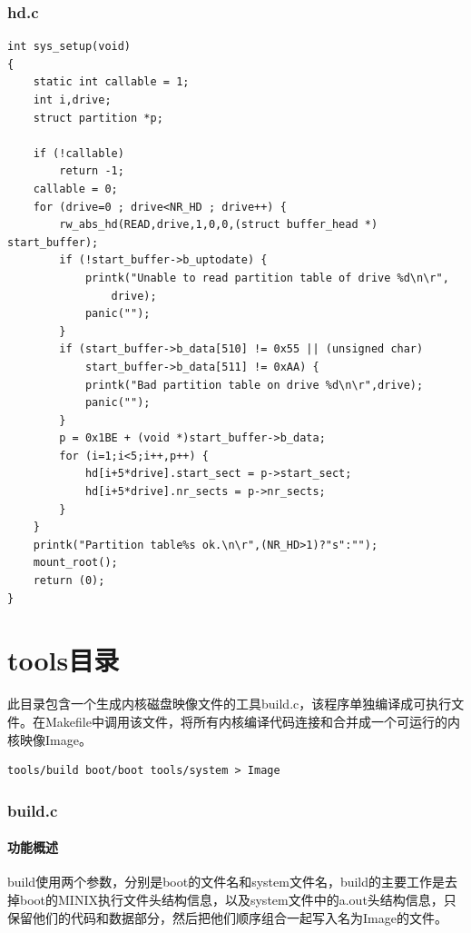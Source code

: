 \documentclass[12pt]{article}
\begin{document}
\section{hd.c}
\begin{lstlisting}[breaklines]
int sys_setup(void)
{
	static int callable = 1;
	int i,drive;
	struct partition *p;

	if (!callable)
		return -1;
	callable = 0;
	for (drive=0 ; drive<NR_HD ; drive++) {
		rw_abs_hd(READ,drive,1,0,0,(struct buffer_head *) start_buffer);
		if (!start_buffer->b_uptodate) {
			printk("Unable to read partition table of drive %d\n\r",
				drive);
			panic("");
		}
		if (start_buffer->b_data[510] != 0x55 || (unsigned char)
		    start_buffer->b_data[511] != 0xAA) {
			printk("Bad partition table on drive %d\n\r",drive);
			panic("");
		}
		p = 0x1BE + (void *)start_buffer->b_data;
		for (i=1;i<5;i++,p++) {
			hd[i+5*drive].start_sect = p->start_sect;
			hd[i+5*drive].nr_sects = p->nr_sects;
		}
	}
	printk("Partition table%s ok.\n\r",(NR_HD>1)?"s":"");
	mount_root();
	return (0);
}
\end{lstlisting}
\part{tools目录}
此目录包含一个生成内核磁盘映像文件的工具build.c，该程序单独编译成可执行文件。在Makefile中调用该文件，将所有内核编译代码连接和合并成一个可运行的内核映像Image。
\begin{lstlisting}[breaklines]
tools/build boot/boot tools/system > Image
\end{lstlisting}
\section{build.c}
\subsection{功能概述}	
build使用两个参数，分别是boot的文件名和system文件名，build的主要工作是去掉boot的MINIX执行文件头结构信息，以及system文件中的a.out头结构信息，只保留他们的代码和数据部分，然后把他们顺序组合一起写入名为Image的文件。
\end{document}
